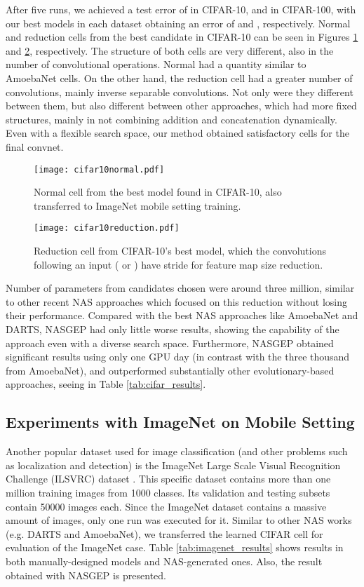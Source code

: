 \documentclass[conference]{IEEEtran}
\begin{document}
	After five runs, we achieved a test error of  in CIFAR-10, and  in CIFAR-100, with our best models in each dataset obtaining an error of  and , respectively.
	Normal and reduction cells from the best candidate in CIFAR-10 can be seen in Figures \ref{fig:cifar10_normal} and \ref{fig:cifar10_reduction}, respectively.
	The structure of both cells are very different, also in the number of convolutional operations.
	Normal had a quantity similar to AmoebaNet cells.
	On the other hand, the reduction cell had a greater number of convolutions, mainly inverse separable convolutions. 
	Not only were they different between them, but also different between other approaches, which had more fixed structures, mainly in not combining addition and concatenation dynamically.
	Even with a flexible search space, our method obtained satisfactory cells for the final convnet.
	
	
	\begin{figure}[htb]
		\centering
		\texttt{[image: cifar10normal.pdf]}
		\caption{Normal cell from the best model found in CIFAR-10, also transferred to ImageNet mobile setting training.}
		\label{fig:cifar10_normal}
	\end{figure}
	\begin{figure}[htb]
		\centering
		\texttt{[image: cifar10reduction.pdf]}	
		\caption{Reduction cell from CIFAR-10's best model, which the convolutions following an input ( or ) have stride  for feature map size reduction.}
		\label{fig:cifar10_reduction}        
	\end{figure}
	
	Number of parameters from candidates chosen were around three million, similar to other recent NAS approaches which focused on this reduction without losing their performance.
	Compared with the best NAS approaches like AmoebaNet and DARTS, NASGEP had only little worse results, showing the capability of the approach even with a diverse search space.
	Furthermore, NASGEP obtained significant results using only one GPU day (in contrast with the three thousand from AmoebaNet), and outperformed substantially other evolutionary-based approaches, seeing in Table \ref{tab:cifar_results}.  
	
	\subsection{Experiments with ImageNet on Mobile Setting}
	
	Another popular dataset used for image classification (and other problems such as localization and detection) is the ImageNet Large Scale Visual Recognition Challenge (ILSVRC) dataset \cite{deng2009imagenet}.
	This specific dataset contains more than one million training images from 1000 classes.
	Its validation and testing subsets contain 50000 images each.
	Since the ImageNet dataset contains a massive amount of images, only one run was executed for it.
	Similar to other NAS works (e.g. DARTS and AmoebaNet), we transferred the learned CIFAR cell for evaluation of the ImageNet case.
	Table \ref{tab:imagenet_results} shows results in both manually-designed models and NAS-generated ones. 
	Also, the result obtained with NASGEP is presented.    
	
\end{document}
